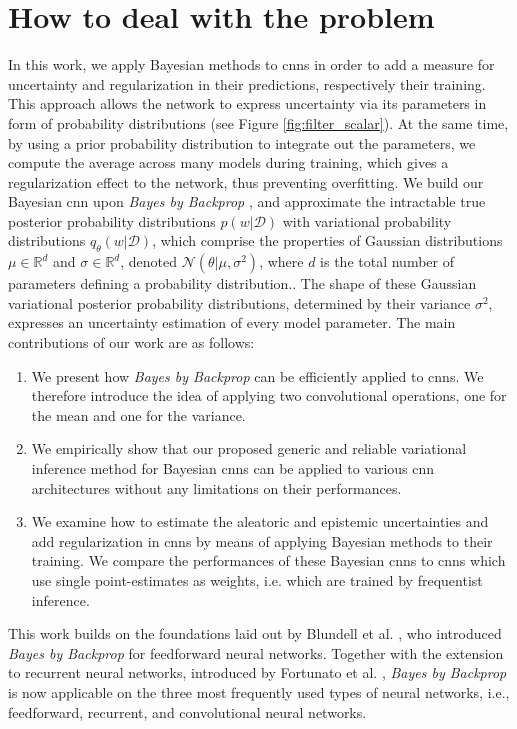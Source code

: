 \section{How to deal with the problem}


\newline In this work, we apply Bayesian methods to \acp{cnn} in order to add a measure for uncertainty and regularization in their predictions, respectively their training. This approach allows the network to express uncertainty via its parameters in form of probability distributions (see Figure \ref{fig:filter_scalar}). At the same time, by using a prior probability distribution to integrate out the parameters, we compute the average across many models during training, which gives a regularization effect to the network, thus preventing overfitting.
\newline We build our Bayesian \ac{cnn} upon \textit{Bayes by Backprop} \cite{graves2011practical,blundell2015weight}, and approximate the intractable true posterior probability distributions $p(w|\mathcal{D})$ with variational probability distributions $q_{\theta}(w|\mathcal{D})$, which comprise the properties of Gaussian distributions $\mu \in \mathbb{R}^d$ and $\sigma \in \mathbb{R}^d$, denoted $\mathcal{N}(\theta|\mu, \sigma^2)$, where $d$ is the total number of parameters defining a probability distribution.. The shape of these Gaussian variational posterior probability distributions, determined by their variance $\sigma^2$, expresses an uncertainty estimation of every model parameter. The main contributions of our work are as follows: 
\begin{enumerate}
    \item We present how \textit{Bayes by Backprop} can be efficiently applied to \acp{cnn}. We therefore introduce the idea of applying two convolutional operations, one for the mean and one for the variance.
    \item We empirically show that our proposed generic and reliable variational inference method for Bayesian \acp{cnn} can be applied to various \ac{cnn} architectures without any limitations on their performances. 
    \item We examine how to estimate the aleatoric and epistemic uncertainties and add regularization in \acp{cnn} by means of applying Bayesian methods to their training. We compare the performances of these Bayesian \acp{cnn} to \acp{cnn} which use single point-estimates as weights, i.e. which are trained by frequentist inference.
\end{enumerate} 
This work builds on the foundations laid out by Blundell et al. \cite{blundell2015weight}, who introduced \textit{Bayes by Backprop} for feedforward neural networks. Together with the extension to recurrent neural networks, introduced by Fortunato et al. \cite{fortunato2017bayesian}, \textit{Bayes by Backprop} is now applicable on the three most frequently used types of neural networks, i.e., feedforward, recurrent, and convolutional neural networks.

